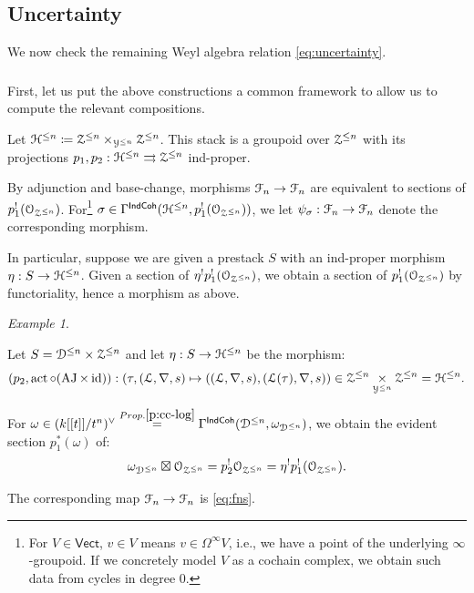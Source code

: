 \documentclass[reqno,11pt]{amsart}
\numberwithin{equation}{subsection}
\theoremstyle{remark}
\newtheorem{example}[thm]{Example}
\newcommand{\sD}{{\EuScript D}}
\newcommand{\sF}{{\EuScript F}}
\newcommand{\sH}{{\EuScript H}}
\newcommand{\sL}{{\EuScript L}}
\newcommand{\sO}{{\EuScript O}}
\newcommand{\sY}{{\EuScript Y}}
\newcommand{\sZ}{{\EuScript Z}}
\newcommand{\on}{\operatorname}
\newcommand{\id}{\on{id}}
\newcommand{\act}{\on{act}}
\newcommand{\Vect}{\mathsf{Vect}}
\newcommand{\IndCoh}{\mathsf{IndCoh}}
\newcommand{\AJ}{\on{AJ}}
\begin{document}
\subsection{Uncertainty}

We now check the remaining Weyl algebra relation
\eqref{eq:uncertainty}.

\subsubsection{}\label{ss:gpd}

First, let us put the above constructions a common framework to allow us to 
compute the relevant compositions.

Let $\sH^{\leq n} \coloneqq \sZ^{\leq n} \times_{\sY^{\leq n}} \sZ^{\leq n}$.
This stack is a groupoid over $\sZ^{\leq n}$ with its projections
$p_1,p_2:\sH^{\leq n} \rightrightarrows \sZ^{\leq n}$ ind-proper.

By adjunction and base-change, morphisms $\sF_n \to \sF_n$ are equivalent to
sections of $p_1^!(\sO_{\sZ^{\leq n}})$. For\footnote{For $V \in \Vect$,
$v\in V$ means $v \in \Omega^{\infty} V$, i.e., we have a point of the
underlying $\infty$-groupoid. If we concretely model $V$ as a cochain
complex, we obtain such data from cycles in degree $0$.}
$\sigma \in \Gamma^{\IndCoh}(\sH^{\leq n},p_1^!(\sO_{\sZ^{\leq n}}))$, 
we let $\psi_{\sigma}:\sF_n \to \sF_n$ denote the corresponding morphism.

In particular, suppose we are given a prestack $S$ with an ind-proper morphism
$\eta:S \to \sH^{\leq n}$. Given a section of 
$\eta^!p_1^!(\sO_{\sZ^{\leq n}})$, we obtain a section of 
$p_1^!(\sO_{\sZ^{\leq n}})$ by functoriality, hence a morphism
as above.

\begin{example}\label{e:fns}

Let $S = \sD^{\leq n} \times \sZ^{\leq n}$ and let
$\eta:S \to \sH^{\leq n}$
be the morphism: 
%
\[
(p_2,\act\circ (\AJ \times \id)):
(\tau,(\sL,\nabla,s) \mapsto ((\sL,\nabla,s),(\sL(\tau),\nabla,s)) \in 
\sZ^{\leq n} \underset{\sY^{\leq n}}{\times} \sZ^{\leq n} = 
\sH^{\leq n}.
\]

For $\omega \in (k[[t]]/t^n)^{\vee} \overset{Prop. \ref{p:cc-log}}{=} 
\Gamma^{\IndCoh}(\sD^{\leq n},\omega_{\sD^{\leq n}})$, we
obtain the evident section $p_1^*(\omega)$ of:
%
\[
\omega_{\sD^{\leq n}} \boxtimes \sO_{\sZ^{\leq n}} = 
p_2^! \sO_{\sZ^{\leq n}}  = 
\eta^!p_1^!(\sO_{\sZ^{\leq n}}).
\]

\noindent The corresponding map $\sF_n \to \sF_n$ is
\eqref{eq:fns}.

\end{example}
\end{document}
